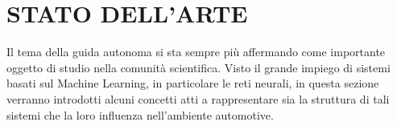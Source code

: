 
\chapter{STATO DELL'ARTE}
\label{Capitolo2}
\thispagestyle{empty}

Il tema della guida autonoma si sta sempre più affermando come importante 
oggetto di studio nella comunità scientifica. Visto il grande impiego di sistemi 
basati sul Machine Learning, in particolare le reti neurali, in questa sezione 
verranno introdotti alcuni concetti atti a rappresentare sia la struttura di tali 
sistemi che la loro influenza nell'ambiente automotive. 

